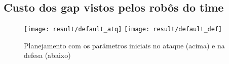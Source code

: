 \subsection{Custo dos gap vistos pelos robôs do time}

\begin{figure}[H]
  \centering
  \texttt{[image: result/default\_atq]}
  \texttt{[image: result/default\_def]}
  \caption{Planejamento com os parâmetros iniciais no
           ataque (acima) e na defesa (abaixo)}\label{fig:default}
\end{figure}

